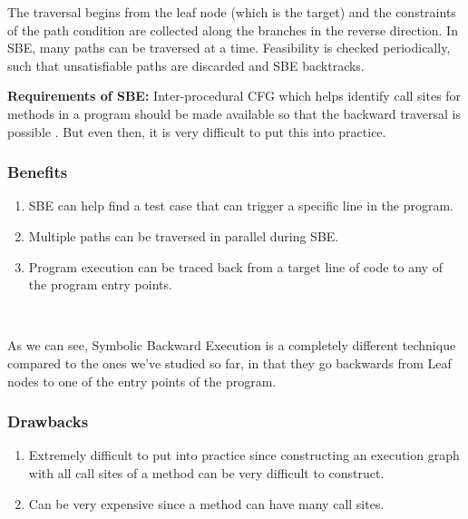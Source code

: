 \documentclass[11pt]{llncs}
\begin{document}
		\vspace{2mm}
		
		The traversal begins from the leaf node (which is the target) and the constraints of the path condition are collected along the branches in the reverse direction. In SBE, many paths can be traversed at a time. Feasibility is checked periodically, such that unsatisfiable paths are discarded and SBE backtracks. \cite{2_Survey_SE}

		\vspace{2mm}

		\textbf{Requirements of SBE:} Inter-procedural CFG which helps identify call sites for methods in a program should be made available so that the backward traversal is possible \cite{2_Survey_SE}. But even then, it is very difficult to put this into practice.


		\subsubsection{Benefits}
			\begin{enumerate}
				\vspace{-0.7mm}
				\item SBE can help find a test case that can trigger a specific line in the program. 
				\item Multiple paths can be traversed in parallel during SBE. \cite{2_Survey_SE}
				\item Program execution can be traced back from a target line of code to any of the program entry points. \cite{16_sbe}
			\end{enumerate}

		~
		\vspace{1mm}

		As we can see, Symbolic Backward Execution is a completely different technique compared to the ones we've studied so far, in that they go backwards from Leaf nodes to one of the entry points of the program.
			
			
		\subsubsection{Drawbacks}
			\begin{enumerate}
				\item Extremely difficult to put into practice since constructing an execution graph with all call sites of a method can be very difficult to construct.
				\item Can be very expensive since a method can have many call sites. \cite{2_Survey_SE}

			\end{enumerate}
\end{document}
